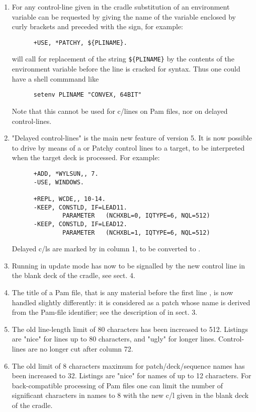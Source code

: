 \begin{enumerate}
\item
For any control-line given in the cradle substitution of an
environment variable can be requested by giving the name of the
variable enclosed by curly brackets and preceded with the \Lit{$} sign,
for example:
\begin{verbatim}
      +USE, *PATCHY, ${PLINAME}.
\end{verbatim}
will call for replacement of the string \verb!${PLINAME}! by the contents of
the environment variable  before the line is cracked for syntax.
Thus one could have a shell commmand like
\begin{verbatim}
      setenv PLINAME "CONVEX, 64BIT"
\end{verbatim}
Note that this cannot be used for c/lines on Pam files, nor on
delayed control-lines.

\item
"Delayed control-lines" is the main new feature of version 5.
It is now possible to drive by means of a  or 
Patchy control lines to a target, to be interpreted when the target deck
is processed.
For example:
\begin{verbatim}
      +ADD, *WYLSUN,, 7.
      -USE, WINDOWS.

      +REPL, WCDE,, 10-14.
      -KEEP, CONSTLD, IF=LEAD11.
              PARAMETER   (NCHXBL=0, IQTYPE=6, NQL=512)
      -KEEP, CONSTLD, IF=LEAD12.
              PARAMETER   (NCHXBL=1, IQTYPE=6, NQL=512)
\end{verbatim}
Delayed c/ls are marked by  in column 1,
to be converted to .

\item
Running in update mode has now to be signalled by the new control
line  in the blank deck of the cradle, see sect. 4.

\item
The title of a Pam file, that is any material before the first
line , is now handled slightly differently: it is considered
as a patch whose name is derived from the Pam-file identifier;
see the description of  in sect. 3.

\item
The old line-length limit of 80 characters has been increased to 512.
Listings are "nice" for lines up to 80 characters, and "ugly" for longer
lines. Control-lines are no longer cut after column 72.

\item
The old limit of 8 characters maximum for patch/deck/sequence names has
been increased to 32. Listings are "nice" for names of up to 12 characters.
For back-compatible processing of Pam files one can limit the number of
significant characters in names to 8 with the new c/l 
given in the blank deck of the cradle.


\end{enumerate}
